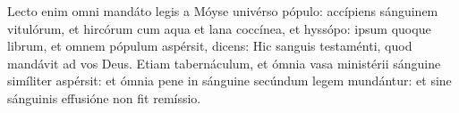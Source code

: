 Lecto enim omni mandáto legis a Móyse univérso pópulo:
	accípiens sánguinem vitulórum, et hircórum cum aqua et lana coccínea, et hyssópo: ipsum quoque librum, et omnem pópulum aspérsit, dicens:
	Hic sanguis testaménti, quod mandávit ad vos Deus.
Etiam tabernáculum, et ómnia vasa ministérii sánguine simíliter aspérsit:
	et ómnia pene in sánguine secúndum legem mundántur:
	et sine sánguinis effusióne non fit remíssio.
